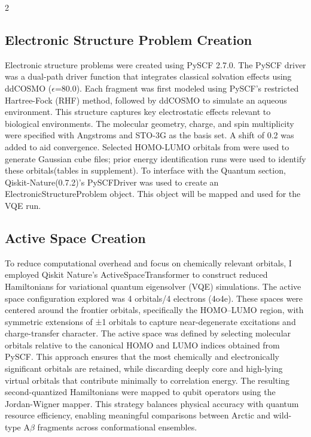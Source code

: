 \documentclass[10pt,a4paper]{article}
\begin{document}
\begin{multicols}{2}
        \subsection{\textbf{Electronic Structure Problem Creation}}
 Electronic structure problems were created using PySCF\cite{pyscf2020} 2.7.0. The PySCF\cite{pyscf2020} driver was a dual-path driver function that integrates classical solvation effects using ddCOSMO ($\epsilon$=80.0). Each fragment was first modeled using PySCF\cite{pyscf2020}’s restricted Hartree-Fock (RHF) method, followed by ddCOSMO to simulate an aqueous environment. This structure captures key electrostatic effects relevant to biological environments. The molecular geometry, charge, and spin multiplicity were specified with Angstroms and STO-3G as the basis set. A shift of 0.2 was added to aid convergence. Selected HOMO-LUMO orbitals from were used to generate Gaussian cube files; prior energy identification runs were used to identify these orbitals(tables in supplement). To interface with the Quantum section, Qiskit-Nature\cite{qiskit2019}\cite{qiskit_nature2021}(0.7.2)’s PySCFDriver\cite{pyscf2020} was used to create an ElectronicStructureProblem object. This object will be mapped and used for the VQE\cite{peruzzo2014} run.

 \subsection{\textbf{Active Space Creation}}
To reduce computational overhead and focus on chemically relevant orbitals, I employed Qiskit\cite{qiskit2019} Nature’s ActiveSpaceTransformer to construct reduced Hamiltonians for variational quantum eigensolver (VQE\cite{peruzzo2014}) simulations.  The active space\cite{active_space} configuration explored was 4 orbitals/4 electrons (4o4e). These spaces were centered around the frontier orbitals, specifically the HOMO–LUMO region, with symmetric extensions of ±1 orbitals to capture near-degenerate excitations and charge-transfer character.
The active space\cite{active_space} was defined by selecting molecular orbitals relative to the canonical HOMO and LUMO indices obtained from PySCF\cite{pyscf2020}. This approach ensures that the most chemically and electronically significant orbitals are retained, while discarding deeply core and high-lying virtual orbitals that contribute minimally to correlation energy. The resulting second-quantized Hamiltonians were mapped to qubit operators using the Jordan-Wigner mapper. This strategy balances physical accuracy with quantum resource efficiency, enabling meaningful comparisons between Arctic and wild-type A$\beta$ fragments across conformational ensembles.\\

\end{multicols}
\end{document}
